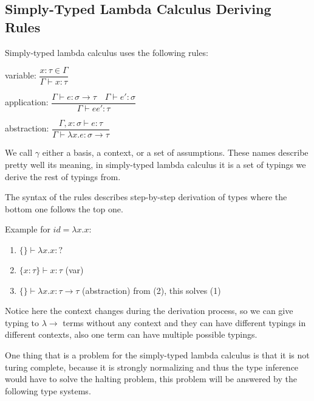 
\subsection{Simply-Typed Lambda Calculus Deriving Rules}

Simply-typed lambda calculus uses the following rules:


variable:
$\dfrac{x : \tau \in \Gamma}{\Gamma \vdash x : \tau}$

application:
$\dfrac{\Gamma \vdash e : \sigma \rightarrow \tau \quad \Gamma \vdash e' : \sigma}{\Gamma \vdash e e' : \tau}$

abstraction:
$\dfrac{\Gamma, x : \sigma \vdash e : \tau}{\Gamma \vdash \lambda x . e : \sigma \rightarrow \tau}$

We call $\gamma$ either a basis, a context, or a set of assumptions. These names describe pretty well its meaning, in simply-typed lambda calculus it
is a set of typings we derive the rest of typings from.

The syntax of the rules describes step-by-step derivation of types where the bottom one follows the top one.

Example for $id = \lambda x . x$:

\begin{enumerate}
    \item $\{\} \vdash \lambda x . x : ?$
    \item $\{x : \tau\} \vdash x : \tau$ (var)
    \item $\{\} \vdash \lambda x . x : \tau \rightarrow \tau$ (abstraction) from (2), this solves (1)
\end{enumerate}

Notice here the context changes during the derivation process, so we can give typing to $\lambda\rightarrow$ terms without any context
and they can have different typings in different contexts, also one term can have multiple possible typings.


One thing that is a problem for the simply-typed lambda calculus is that it is not turing complete, %
because it is strongly normalizing and thus the type inference would have to solve the halting problem,
this problem will be answered by the following type systems.

